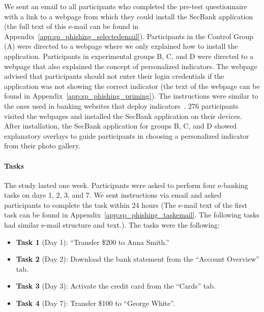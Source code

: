 We sent an email to all participants who completed the pre-test questionnaire
with a link to a webpage from which they could install the SecBank
application (the full text of this e-mail can be found in Appendix~\ref{app:sp_phishing_selectedemail}).
Participants in the Control Group (A) were directed to a webpage
where we only explained how to install the application.
Participants in experimental groups B, C, and D were directed to a webpage that
also explained the concept of personalized indicators. The
webpage advised that participants should not enter their login credentials if
the application was not showing the correct indicator (the text of the webpage can be found in Appendix~\ref{app:sp_phishing_priming}).
The instructions were similar to the ones used in banking websites that deploy indicators~\cite{boa,vanguard}.
276 participants visited the webpages and installed the SecBank application on their devices.
After installation, the SecBank application for groups B, C, and D showed explanatory overlays to guide participants in choosing a personalized indicator from their photo gallery.

\paragraph{Tasks} The study lasted one week. Participants were asked to
perform four e-banking tasks on days 1, 2, 3, and 7. We sent instructions via email and asked participants to complete the task within
24 hours (The e-mail text of the first task can be found in Appendix~\ref{app:sp_phishing_taskemail}. The following tasks had similar e-mail structure and text.).
The tasks were the following:

\begin{itemize}
	\item \textbf{Task 1} (Day 1): ``Transfer \$200 to Anna Smith.''
	\item \textbf{Task 2} (Day 2): Download the bank statement from the ``Account Overview'' tab.
	\item \textbf{Task 3} (Day 3): Activate the credit card from the ``Cards'' tab.
	\item \textbf{Task 4} (Day 7): Transfer \$100 to ``George White''.
\end{itemize}


